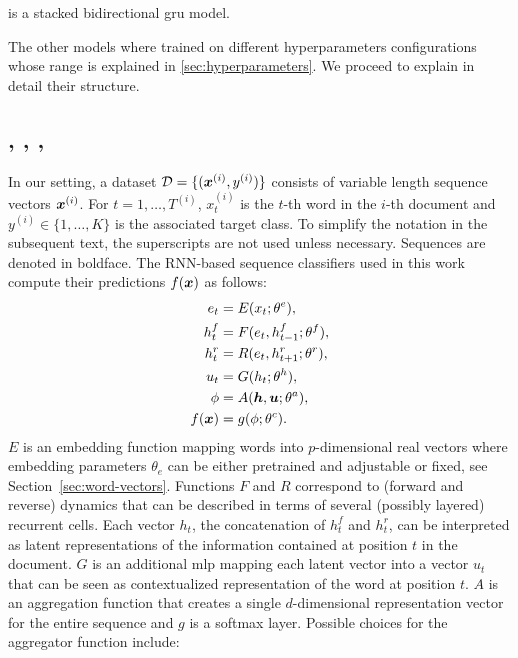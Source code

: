 \gru{} is a stacked bidirectional \ac{gru} model.

The other models where trained on different hyperparameters
configurations whose range is explained in
\cref{sec:hyperparameters}. We proceed to explain in detail their
structure.
\subsection{\maxp, \softmax, \maxi, \softmaxi}
\label{sec:model}
In our setting, a dataset $\mathcal{D}=\{(\bm{x}^{(i)},y^{(i)})\}$
consists of variable length sequence vectors $\bm{x}^{(i)}$. For
$t=1,\dots,T^{(i)}$, $x^{(i)}_t$ is the $t$-th word in the $i$-th
document and $y^{(i)}\in\{1,\dots,K\}$ is the associated target
class. To simplify the notation in the subsequent text, the
superscripts are not used unless necessary. Sequences are
denoted in boldface. The RNN-based sequence classifiers used in
this work compute their predictions $f(\bm{x})$ as follows:
\begin{align}
  e_t &= E(x_t;\theta^e),\label{eq:embed}\\
  h^f_t &= F(e_t,h^f_{t-1};\theta^f),\label{eq:maxModelRL}\\  
  h^r_t &= R(e_t,h^r_{t+1};\theta^r),\label{eq:maxModelRR}\\
  u_t &= G(h_t;\theta^h),\label{eq:maxModelF}\\
  \phi &= A(\bm{h},\bm{u};\theta^a),\label{eq:aggregation}\\
  f(\bm{x}) &= g(\phi;\theta^c).\label{eq:maxModelC}
\end{align}
$E$ is an embedding function mapping words into $p$-dimensional real
vectors where embedding parameters $\theta_e$ can be either
pretrained and adjustable or fixed, see
Section~\ref{sec:word-vectors}.  Functions $F$ and $R$ correspond to
(forward and reverse) 
dynamics that can be described in terms of several (possibly layered)
recurrent cells. Each vector $h_t$,
the concatenation of $h^f_t$ and $h^r_t$, can be interpreted as latent
representations of the information contained at position $t$ in the
document. $G$ is an additional \ac{mlp} mapping each latent vector into a
vector $u_t$ that can be seen as contextualized representation of the
word at position $t$. $A$ is an aggregation function that creates a
single $d$-dimensional representation vector for the entire sequence
and $g$ is a softmax layer. Possible choices for the aggregator
function include:
